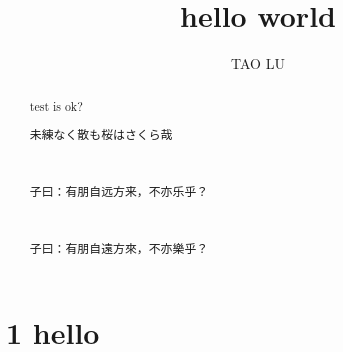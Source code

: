 \documentclass[a4paper,11pt]{report}
\title{hello world}
\author{TAO LU}
\begin{document}
\maketitle
\tableofcontents

\begin{abstract}
test is ok?\\
\begin{CJK}{UTF8}{min}未練なく散も桜はさくら哉\end{CJK}\\
\begin{CJK}{UTF8}{gbsn}子曰：有朋自远方来，不亦乐乎？\end{CJK}\\
\begin{CJK}{UTF8}{bsmi}子曰：有朋自遠方來，不亦樂乎？\end{CJK}
\end{abstract}

\chapter{1 hello}
\end{document}
